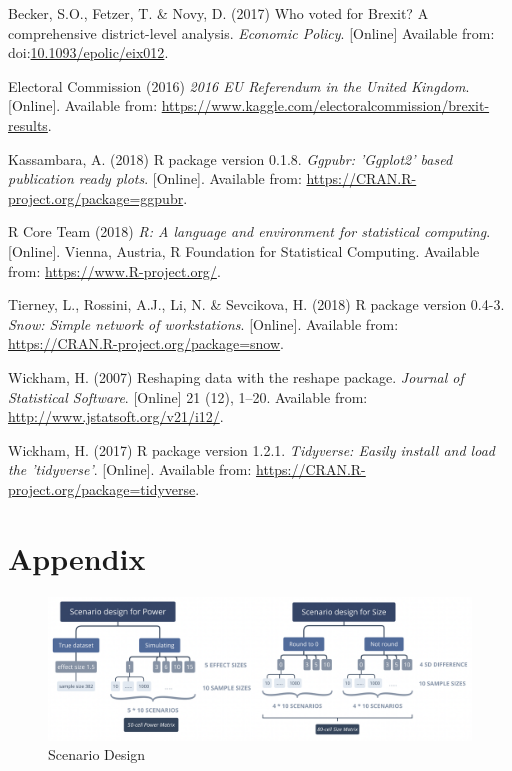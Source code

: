 \documentclass[]{article}
\begin{document}
\leavevmode\hypertarget{ref-Becker2017}{}%
Becker, S.O., Fetzer, T. \& Novy, D. (2017) Who voted for Brexit? A
comprehensive district-level analysis. \emph{Economic Policy}.
{[}Online{]} Available from:
doi:\href{https://doi.org/10.1093/epolic/eix012}{10.1093/epolic/eix012}.

\leavevmode\hypertarget{ref-ElectoralCommission2016}{}%
Electoral Commission (2016) \emph{2016 EU Referendum in the United
Kingdom}. {[}Online{]}. Available from:
\url{https://www.kaggle.com/electoralcommission/brexit-results}.

\leavevmode\hypertarget{ref-ggpubr}{}%
Kassambara, A. (2018) R package version 0.1.8. \emph{Ggpubr: 'Ggplot2'
based publication ready plots}. {[}Online{]}. Available from:
\url{https://CRAN.R-project.org/package=ggpubr}.

\leavevmode\hypertarget{ref-r}{}%
R Core Team (2018) \emph{R: A language and environment for statistical
computing}. {[}Online{]}. Vienna, Austria, R Foundation for Statistical
Computing. Available from: \url{https://www.R-project.org/}.

\leavevmode\hypertarget{ref-snow}{}%
Tierney, L., Rossini, A.J., Li, N. \& Sevcikova, H. (2018) R package
version 0.4-3. \emph{Snow: Simple network of workstations}.
{[}Online{]}. Available from:
\url{https://CRAN.R-project.org/package=snow}.

\leavevmode\hypertarget{ref-reshape2}{}%
Wickham, H. (2007) Reshaping data with the reshape package.
\emph{Journal of Statistical Software}. {[}Online{]} 21 (12), 1--20.
Available from: \url{http://www.jstatsoft.org/v21/i12/}.

\leavevmode\hypertarget{ref-tidyverse}{}%
Wickham, H. (2017) R package version 1.2.1. \emph{Tidyverse: Easily
install and load the 'tidyverse'}. {[}Online{]}. Available from:
\url{https://CRAN.R-project.org/package=tidyverse}.

\hypertarget{appendix}{%
\section{Appendix}\label{appendix}}

\begin{figure}
\centering
\includegraphics{../figure/scenarios.png}
\caption{Scenario Design}
\end{figure}
\end{document}
